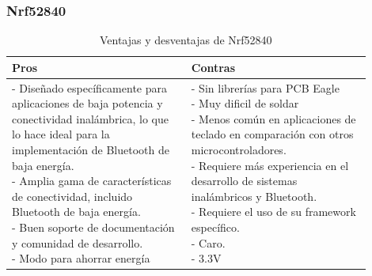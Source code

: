 \subsubsection{Nrf52840}
\begin{table}[H]
\centering
\small
\begin{tabular}{|p{0.45\linewidth}|p{0.45\linewidth}|}
\hline
\textbf{Pros} &
\textbf{Contras} \\
\hline
\parbox[t]{\linewidth}{
\vspace{0.1cm}
- Diseñado específicamente para aplicaciones de baja potencia y conectividad inalámbrica, lo que lo hace ideal para la implementación de \gls{Bluetooth} de baja energía. \medskip \\
- Amplia gama de características de conectividad, incluido \gls{Bluetooth} de baja energía. \medskip \\
- Buen soporte de documentación y comunidad de desarrollo. \medskip \\
- Modo  para ahorrar energía
} &
\parbox[t]{\linewidth}{
\vspace{0.1cm}
- Sin librerías para \gls{PCB} Eagle \medskip \\
- Muy dificil de soldar \medskip \\
- Menos común en aplicaciones de teclado en comparación con otros microcontroladores. \medskip \\
- Requiere más experiencia en el desarrollo de sistemas inalámbricos y \gls{Bluetooth}. \medskip \\
- Requiere el uso de su framework específico. \medskip \\
- Caro. \medskip \\
- 3.3V} \medskip \\
\hline
\end{tabular}
\caption{Ventajas y desventajas de Nrf52840}
\end{table}

